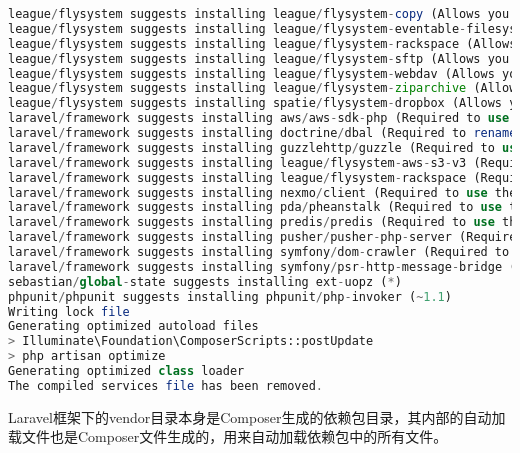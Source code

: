 \begin{lstlisting}[language=PHP]
league/flysystem suggests installing league/flysystem-copy (Allows you to use Copy.com storage)
league/flysystem suggests installing league/flysystem-eventable-filesystem (Allows you to use EventableFilesystem)
league/flysystem suggests installing league/flysystem-rackspace (Allows you to use Rackspace Cloud Files)
league/flysystem suggests installing league/flysystem-sftp (Allows you to use SFTP server storage via phpseclib)
league/flysystem suggests installing league/flysystem-webdav (Allows you to use WebDAV storage)
league/flysystem suggests installing league/flysystem-ziparchive (Allows you to use ZipArchive adapter)
league/flysystem suggests installing spatie/flysystem-dropbox (Allows you to use Dropbox storage)
laravel/framework suggests installing aws/aws-sdk-php (Required to use the SQS queue driver and SES mail driver (~3.0).)
laravel/framework suggests installing doctrine/dbal (Required to rename columns and drop SQLite columns (~2.5).)
laravel/framework suggests installing guzzlehttp/guzzle (Required to use the Mailgun and Mandrill mail drivers and the ping methods on schedules (~6.0).)
laravel/framework suggests installing league/flysystem-aws-s3-v3 (Required to use the Flysystem S3 driver (~1.0).)
laravel/framework suggests installing league/flysystem-rackspace (Required to use the Flysystem Rackspace driver (~1.0).)
laravel/framework suggests installing nexmo/client (Required to use the Nexmo transport (~1.0).)
laravel/framework suggests installing pda/pheanstalk (Required to use the beanstalk queue driver (~3.0).)
laravel/framework suggests installing predis/predis (Required to use the redis cache and queue drivers (~1.0).)
laravel/framework suggests installing pusher/pusher-php-server (Required to use the Pusher broadcast driver (~2.0).)
laravel/framework suggests installing symfony/dom-crawler (Required to use most of the crawler integration testing tools (~3.2).)
laravel/framework suggests installing symfony/psr-http-message-bridge (Required to psr7 bridging features (0.2.*).)
sebastian/global-state suggests installing ext-uopz (*)
phpunit/phpunit suggests installing phpunit/php-invoker (~1.1)
Writing lock file
Generating optimized autoload files
> Illuminate\Foundation\ComposerScripts::postUpdate
> php artisan optimize
Generating optimized class loader
The compiled services file has been removed.
\end{lstlisting}

Laravel框架下的vendor目录本身是Composer生成的依赖包目录，其内部的自动加载文件也是Composer文件生成的，用来自动加载依赖包中的所有文件。


